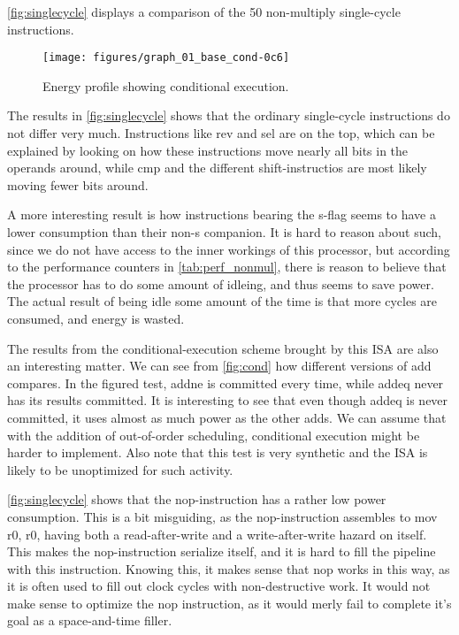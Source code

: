\autoref{fig:singlecycle} displays a comparison of the 50 non-multiply
single-cycle instructions.

\begin{figure}
    \centering
    \texttt{[image: figures/graph\_01\_base\_cond-0c6]}
    \caption{Energy profile showing conditional execution.}
    \label{fig:cond}
\end{figure}

The results in \autoref{fig:singlecycle} shows that the ordinary single-cycle
instructions do not differ very much. Instructions like {\ttfamily rev} and
{\ttfamily sel} are on the top, which can be explained by looking on how these
instructions move nearly all bits in the operands around, while {\ttfamily cmp}
and the different shift-instructios are most likely moving fewer bits around.

A more interesting result is how instructions bearing the {\ttfamily s}-flag
seems to have a lower consumption than their non-{\ttfamily s} companion. It is
hard to reason about such, since we do not have access to the inner workings of
this processor, but according to the performance counters in
\autoref{tab:perf_nonmul}, there is reason to believe that the processor has to
do some amount of idleing, and thus seems to save power. The actual result of
being idle some amount of the time is that more cycles are consumed, and energy
is wasted.

The results from the conditional-execution scheme brought by this ISA are also
an interesting matter. We can see from \autoref{fig:cond} how different versions
of {\ttfamily add} compares. In the figured test, {\ttfamily addne} is committed
every time, while {\ttfamily addeq} never has its results committed. It is
interesting to see that even though {\ttfamily addeq} is never committed, it
uses almost as much power as the other {\ttfamily add}s. We can assume that with
the addition of out-of-order scheduling, conditional execution might be harder
to implement. Also note that this test is very synthetic and the ISA is likely
to be unoptimized for such activity.

\autoref{fig:singlecycle} shows that the {\ttfamily nop}-instruction has a
rather low power consumption. This is a bit misguiding, as the {\ttfamily
nop}-instruction assembles to {\ttfamily mov r0, r0}, having both a
read-after-write and a write-after-write hazard on itself. This makes the
{\ttfamily nop}-instruction serialize itself, and it is hard to fill the
pipeline with this instruction. Knowing this, it makes sense that {\ttfamily
nop} works in this way, as it is often used to fill out clock cycles with
non-destructive work. It would not make sense to optimize the {\ttfamily nop}
instruction, as it would merly fail to complete it's goal as a space-and-time
filler.

